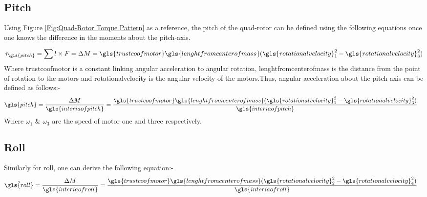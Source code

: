 \subsection{Pitch}
Using Figure \ref{Fig:Quad-Rotor Torque Pattern} as a reference, the pitch of the quad-rotor can be defined using the following equations once one knows the difference in the moments about the pitch-axis.

\begin{equation}
	\tau_{\gls{pitch}} = \sum l \times F =\Delta M =  \gls{trustcoofmotor} \gls{lenghtfromcenterofmass}( \gls{rotationalvelocity}_1 ^2-\gls{rotationalvelocity}_3 ^2)
\end{equation}
Where  \gls{trustcoofmotor} is a constant linking angular acceleration to angular rotation, \gls{lenghtfromcenterofmass} is the distance from the point of rotation to the motors and \gls{rotationalvelocity} is the angular velocity of the motors.Thus, angular acceleration about the pitch axis can be defined as follows:-
\begin{align}
	\ddot{\gls{pitch}} & = \frac{\Delta M}{\gls{interiaofpitch}} =\frac{ \gls{trustcoofmotor} \gls{lenghtfromcenterofmass}( \gls{rotationalvelocity}_1 ^2-\gls{rotationalvelocity}_3 ^2)}{ \gls{interiaofpitch} }
	\label{eq: pitch model}
\end{align}
Where $\omega_1$ \& $\omega_3$ are the speed of motor one and three respectively. 
\subsection{Roll}
Similarly for roll, one can derive the following equation:-
\begin{align}
	\ddot{\gls{roll}} & = \frac{\Delta M}{\gls{interiaofroll}} =\frac{\gls{trustcoofmotor}\gls{lenghtfromcenterofmass}(\gls{rotationalvelocity}_2^2-\gls{rotationalvelocity}_4^2) }{\gls{interiaofroll}}
	\label{eq: roll model}
\end{align}

